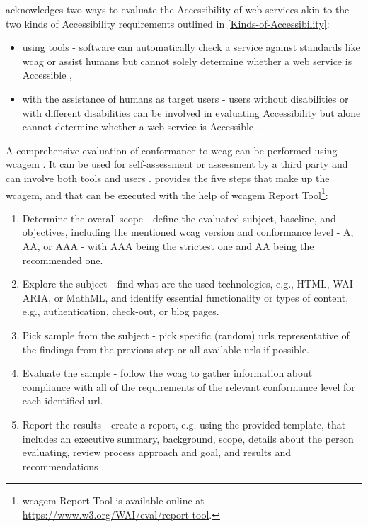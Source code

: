 \textcite{WAI_Evaluation} acknowledges two ways to evaluate the Accessibility of web services akin to the two kinds of Accessibility requirements outlined in \ref{Kinds-of-Accessibility}:

\begin{itemize}
    \item using tools - software can automatically check a service against standards like \gls{wcag} or assist humans but cannot solely determine whether a web service is Accessible \parencite{WAI_Evaluation_Tools},
    \item with the assistance of humans as target users - users without disabilities or with different disabilities can be involved in evaluating Accessibility but alone cannot determine whether a web service is Accessible \parencite{WAI_Evaluation_Users}.
\end{itemize}

A comprehensive evaluation of conformance to \gls{wcag} can be performed using \gls{wcagem} \parencite{WAI_Evaluation_Methodology}.
It can be used for self-assessment or assessment by a third party and can involve both tools and users \parencite{WAI_Evaluation_Methodology}.
\textcite{WAI_Evaluation_Methodology} provides the five steps that make up the \gls{wcagem}, and that can be executed with the help of \gls{wcagem} Report Tool\footnote{\gls{wcagem} Report Tool is available online at \url{https://www.w3.org/WAI/eval/report-tool}.}:

\begin{enumerate}
    \item Determine the overall scope - define the evaluated subject, baseline, and objectives, including the mentioned \gls{wcag} version and conformance level - A, AA, or AAA - with AAA being the strictest one and AA being the recommended one.
    \item Explore the subject - find what are the used technologies, e.g., HTML, WAI-ARIA, or MathML, and identify essential functionality or types of content, e.g., authentication, check-out, or blog pages.
    \item Pick sample from the subject - pick specific (random) \glspl{url} representative of the findings from the previous step or all available \glspl{url} if possible.
    \item Evaluate the sample - follow the \gls{wcag} to gather information about compliance with all of the requirements of the relevant conformance level for each identified \gls{url}.
    \item Report the results - create a report, e.g. using the provided template, that includes an executive summary, background, scope, details about the person evaluating, review process approach and goal, and results and recommendations \parencite{WAI_Evalutation_Report}.
\end{enumerate}

